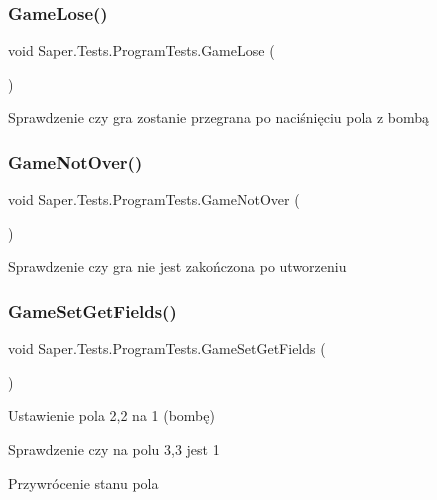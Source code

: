 \subsubsection{\texorpdfstring{GameLose()}{GameLose()}}
{\footnotesize\ttfamily void Saper.\+Tests.\+Program\+Tests.\+Game\+Lose (\begin{DoxyParamCaption}{ }\end{DoxyParamCaption})}

Sprawdzenie czy gra zostanie przegrana po naciśnięciu pola z bombą \mbox{\label{class_saper_1_1_tests_1_1_program_tests_a21d337cc8f3c53f0296a8853c2783818}} 
\subsubsection{\texorpdfstring{GameNotOver()}{GameNotOver()}}
{\footnotesize\ttfamily void Saper.\+Tests.\+Program\+Tests.\+Game\+Not\+Over (\begin{DoxyParamCaption}{ }\end{DoxyParamCaption})}

Sprawdzenie czy gra nie jest zakończona po utworzeniu \mbox{\label{class_saper_1_1_tests_1_1_program_tests_afbf5122edc7a9945db74f8ecad4cae41}} 
\subsubsection{\texorpdfstring{GameSetGetFields()}{GameSetGetFields()}}
{\footnotesize\ttfamily void Saper.\+Tests.\+Program\+Tests.\+Game\+Set\+Get\+Fields (\begin{DoxyParamCaption}{ }\end{DoxyParamCaption})}

Ustawienie pola 2,2 na 1 (bombę)

Sprawdzenie czy na polu 3,3 jest 1

Przywrócenie stanu pola \mbox{\label{class_saper_1_1_tests_1_1_program_tests_afef65abd57fa4fd8ef39967855e4c1b2}} 
